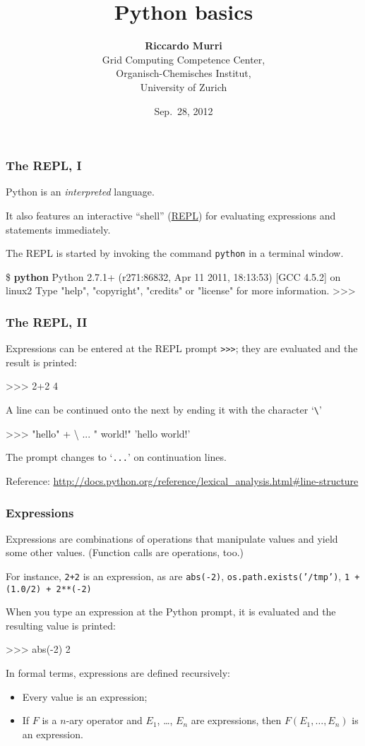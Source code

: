 \documentclass[english,serif,mathserif,xcolor=pdftex,dvipsnames,table]{beamer}
\title{%
  Python basics
}
\author[R. Murri]{%
  \textbf{Riccardo Murri} \\
  Grid Computing Competence Center, \\
  Organisch-Chemisches Institut, \\
  University of Zurich
}
\date{Sep.~28, 2012}
\begin{document}
\maketitle


\begin{frame}[fragile]
  \frametitle{The REPL, I}
  Python is an \emph{interpreted} language.

  \+
  It also features an interactive ``shell''
  (\href{http://en.wikipedia.org/wiki/REPL}{REPL}) for evaluating
  expressions and statements immediately.

  \+
  The REPL is started by invoking the command \texttt{python} in a
  terminal window.
\begin{semiverbatim}\small
\$ \textbf{python}
Python 2.7.1+ (r271:86832, Apr 11 2011, 18:13:53) 
[GCC 4.5.2] on linux2
Type "help", "copyright", "credits" or "license" 
for more information.
>>> 
\end{semiverbatim}
\end{frame}

\begin{frame}[fragile]
  \frametitle{The REPL, II}
  Expressions can be entered at the REPL prompt \texttt{>>>}; they are
  evaluated and the result is printed:
\begin{semiverbatim}
>>> 2+2
4
\end{semiverbatim}

  \+
  A line can be continued onto the next by ending it with the
  character `\texttt{\textbackslash}'
\begin{semiverbatim}
>>> "hello" + \textbackslash
... " world!"
'hello world!'
\end{semiverbatim}
  The prompt changes to `\texttt{...}' on continuation lines.

  \+\scriptsize
  Reference:
  \url{http://docs.python.org/reference/lexical_analysis.html#line-structure}
\end{frame}


\begin{frame}[fragile]
  \frametitle{Expressions}

  Expressions are combinations of operations that manipulate values
  and yield some other values.  (Function calls are operations, too.)

  \+ 
  For instance, \texttt{2+2} is an expression, as are
  \texttt{abs(-2)}, \texttt{os.path.exists('/tmp')},
  \texttt{1 + (1.0/2) + 2**(-2)}

  \+ 
  When you type an expression at the Python prompt,
  it is evaluated and the resulting value is printed:
\begin{semiverbatim}
>>> abs(-2)
2
\end{semiverbatim}

  \+\scriptsize
  In formal terms, expressions are defined recursively:
  \begin{itemize}
  \item Every value is an expression;
  \item If $F$ is a $n$-ary operator and $E_1$, \ldots, $E_n$ are
    expressions, then $F(E_1, \ldots, E_n)$ is an expression.
  \end{itemize}
\end{frame}
\end{document}
